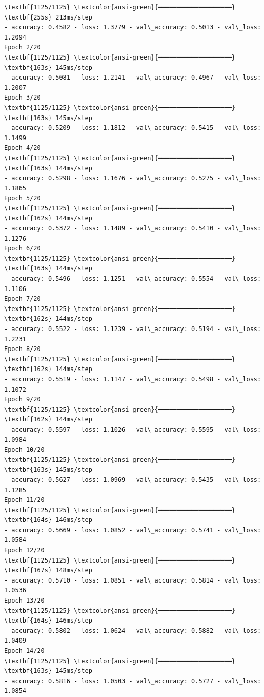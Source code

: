 \documentclass[11pt]{article}
\begin{document}
    \begin{Verbatim}[commandchars=\\\{\}]
\textbf{1125/1125} \textcolor{ansi-green}{━━━━━━━━━━━━━━━━━━━━} \textbf{255s} 213ms/step
- accuracy: 0.4582 - loss: 1.3779 - val\_accuracy: 0.5013 - val\_loss: 1.2094
Epoch 2/20
\textbf{1125/1125} \textcolor{ansi-green}{━━━━━━━━━━━━━━━━━━━━} \textbf{163s} 145ms/step
- accuracy: 0.5081 - loss: 1.2141 - val\_accuracy: 0.4967 - val\_loss: 1.2007
Epoch 3/20
\textbf{1125/1125} \textcolor{ansi-green}{━━━━━━━━━━━━━━━━━━━━} \textbf{163s} 145ms/step
- accuracy: 0.5209 - loss: 1.1812 - val\_accuracy: 0.5415 - val\_loss: 1.1499
Epoch 4/20
\textbf{1125/1125} \textcolor{ansi-green}{━━━━━━━━━━━━━━━━━━━━} \textbf{163s} 144ms/step
- accuracy: 0.5298 - loss: 1.1676 - val\_accuracy: 0.5275 - val\_loss: 1.1865
Epoch 5/20
\textbf{1125/1125} \textcolor{ansi-green}{━━━━━━━━━━━━━━━━━━━━} \textbf{162s} 144ms/step
- accuracy: 0.5372 - loss: 1.1489 - val\_accuracy: 0.5410 - val\_loss: 1.1276
Epoch 6/20
\textbf{1125/1125} \textcolor{ansi-green}{━━━━━━━━━━━━━━━━━━━━} \textbf{163s} 144ms/step
- accuracy: 0.5496 - loss: 1.1251 - val\_accuracy: 0.5554 - val\_loss: 1.1106
Epoch 7/20
\textbf{1125/1125} \textcolor{ansi-green}{━━━━━━━━━━━━━━━━━━━━} \textbf{162s} 144ms/step
- accuracy: 0.5522 - loss: 1.1239 - val\_accuracy: 0.5194 - val\_loss: 1.2231
Epoch 8/20
\textbf{1125/1125} \textcolor{ansi-green}{━━━━━━━━━━━━━━━━━━━━} \textbf{162s} 144ms/step
- accuracy: 0.5519 - loss: 1.1147 - val\_accuracy: 0.5498 - val\_loss: 1.1072
Epoch 9/20
\textbf{1125/1125} \textcolor{ansi-green}{━━━━━━━━━━━━━━━━━━━━} \textbf{162s} 144ms/step
- accuracy: 0.5597 - loss: 1.1026 - val\_accuracy: 0.5595 - val\_loss: 1.0984
Epoch 10/20
\textbf{1125/1125} \textcolor{ansi-green}{━━━━━━━━━━━━━━━━━━━━} \textbf{163s} 145ms/step
- accuracy: 0.5627 - loss: 1.0969 - val\_accuracy: 0.5435 - val\_loss: 1.1285
Epoch 11/20
\textbf{1125/1125} \textcolor{ansi-green}{━━━━━━━━━━━━━━━━━━━━} \textbf{164s} 146ms/step
- accuracy: 0.5669 - loss: 1.0852 - val\_accuracy: 0.5741 - val\_loss: 1.0584
Epoch 12/20
\textbf{1125/1125} \textcolor{ansi-green}{━━━━━━━━━━━━━━━━━━━━} \textbf{167s} 148ms/step
- accuracy: 0.5710 - loss: 1.0851 - val\_accuracy: 0.5814 - val\_loss: 1.0536
Epoch 13/20
\textbf{1125/1125} \textcolor{ansi-green}{━━━━━━━━━━━━━━━━━━━━} \textbf{164s} 146ms/step
- accuracy: 0.5802 - loss: 1.0624 - val\_accuracy: 0.5882 - val\_loss: 1.0409
Epoch 14/20
\textbf{1125/1125} \textcolor{ansi-green}{━━━━━━━━━━━━━━━━━━━━} \textbf{163s} 145ms/step
- accuracy: 0.5816 - loss: 1.0503 - val\_accuracy: 0.5727 - val\_loss: 1.0854

\end{Verbatim}
\end{document}
